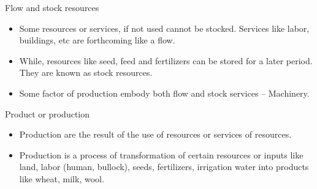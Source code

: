 \documentclass[12pt,ignorenonframetext,aspectratio=169]{beamer}
\providecommand{\tightlist}{%
  \setlength{\itemsep}{0pt}\setlength{\parskip}{0pt}}
\begin{document}
\begin{frame}{}
\protect\hypertarget{section-5}{}
\begin{block}{Flow and stock resources}
\protect\hypertarget{flow-and-stock-resources}{}
\begin{itemize}
\tightlist
\item
  Some resources or services, if not used cannot be stocked. Services
  like labor, buildings, etc are forthcoming like a flow.
\item
  While, resources like seed, feed and fertilizers can be stored for a
  later period. They are known as stock resources.
\item
  Some factor of production embody both flow and stock services --
  Machinery.
\end{itemize}
\end{block}

\begin{block}{Product or production}
\protect\hypertarget{product-or-production}{}
\begin{itemize}
\tightlist
\item
  Production are the result of the use of resources or services of
  resources.
\item
  Production is a process of transformation of certain resources or
  inputs like land, labor (human, bullock), seeds, fertilizers,
  irrigation water into products like wheat, milk, wool.
\end{itemize}
\end{block}
\end{frame}
\end{document}

